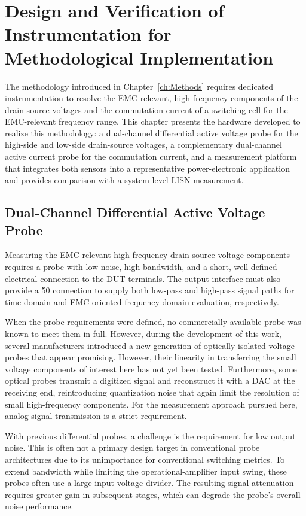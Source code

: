 
\chapter{Design and Verification of Instrumentation for Methodological Implementation}
\label{ch:Sensors}

The methodology introduced in Chapter~\ref{ch:Methods} requires dedicated instrumentation to resolve the EMC-relevant, high-frequency components of the drain-source voltages and the commutation current of a switching cell for the EMC-relevant frequency range.
This chapter presents the hardware developed to realize this methodology: a dual-channel differential active voltage probe for the high-side and low-side drain-source voltages, a complementary dual-channel active current probe for the commutation current, and a measurement platform that integrates both sensors into a representative power-electronic application and provides comparison with a system-level LISN measurement.

\section{Dual-Channel Differential Active Voltage Probe}
\label{ch:voltage}

Measuring the EMC-relevant high-frequency drain-source voltage components requires a probe with low noise, high bandwidth, and a short, well-defined electrical connection to the DUT terminals. 
The output interface must also provide a \SI{50}{\Omega} connection to supply both low-pass and high-pass signal paths for time-domain and EMC-oriented frequency-domain evaluation, respectively.

When the probe requirements were defined, no commercially available probe was known to meet them in full. 
However, during the development of this work, several manufacturers introduced a new generation of optically isolated voltage probes that appear promising. 
However, their linearity in transferring the small voltage components of interest here has not yet been tested. 
Furthermore, some optical probes transmit a digitized signal and reconstruct it with a DAC at the receiving end, reintroducing quantization noise that again limit the resolution of small high-frequency components. 
For the measurement approach pursued here, analog signal transmission is a strict requirement.

With previous differential probes, a challenge is the requirement for low output noise. 
This is often not a primary design target in conventional probe architectures due to its unimportance for conventional switching metrics.
To extend bandwidth while limiting the operational-amplifier input swing, these probes often use a large input voltage divider. 
The resulting signal attenuation requires greater gain in subsequent stages, which can degrade the probe's overall noise performance.

